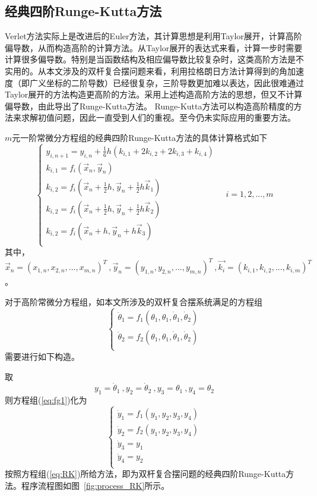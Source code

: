 \documentclass[a4paper,12pt,titlepage]{article}
\begin{document}
\subsection{经典四阶Runge-Kutta方法}
Verlet方法实际上是改进后的Euler方法，其计算思想是利用Taylor展开，计算高阶偏导数，从而构造高阶的计算方法。从Taylor展开的表达式来看，计算一步时需要计算很多偏导数。特别是当函数结构及相应偏导数比较复杂时，这类高阶方法是不实用的。从本文涉及的双杆复合摆问题来看，利用拉格朗日方法计算得到的角加速度（即广义坐标的二阶导数）已经很复杂，三阶导数更加难以表达，因此很难通过Taylor展开的方法构造更高阶的方法。采用上述构造高阶方法的思想，但又不计算偏导数，由此导出了Runge-Kutta方法。
Runge-Kutta方法可以构造高阶精度的方法来求解初值问题，因此一直受到人们的重视。至今仍未实际应用的重要方法。

$m$元一阶常微分方程组的经典四阶Runge-Kutta方法的具体计算格式如下
\begin{equation}
\label{eq:RK}
	\begin{cases}
		y_{i,n+1}=y_{i,n}+\frac{1}{6}h(k_{i,1}+2k_{i,2}+2k_{i,3}+k_{i,4}) \\
		k_{i,1}=f_i(\vec{x}_n,\vec{y}_n)\\
		k_{i,2}=f_i(\vec{x}_n+\frac{1}{2}h,\vec{y}_n+\frac{1}{2}h\vec{k}_1)\\
		k_{i,2}=f_i(\vec{x}_n+\frac{1}{2}h,\vec{y}_n+\frac{1}{2}h\vec{k}_2)\\
		k_{i,2}=f_i(\vec{x}_n+h,\vec{y}_n+h\vec{k}_3)\\
	\end{cases}
	\quad i = 1,2,...,m
\end{equation}
其中，$\vec{x}_n=(x_{1,n},x_{2,n},...,x_{m,n})^T~,\vec{y}_n=(y_{1,n},y_{2,n},...,y_{m,n})^T~,\vec{k_i}=(k_{i,1},k_{i,2},...,k_{i,m})^T$。

对于高阶常微分方程组，如本文所涉及的双杆复合摆系统满足的方程组
\begin{equation}
\label{eq:fg1}
	\begin{cases}
		\ddot{\theta}_1=f_1(\theta_1,\theta_1,\dot{\theta}_1,\dot{\theta}_2)\\
		\ddot{\theta}_2=f_2(\theta_1,\theta_1,\dot{\theta}_1,\dot{\theta}_2)\\
	\end{cases}
\end{equation}
需要进行如下构造。

\noindent 取
\begin{equation}
	 	y_1=\dot{\theta}_1~,
	 	y_2=\dot{\theta}_2~,
	 	y_3=\theta_1~,
	 	y_4=\theta_2
\end{equation}
则方程组(\ref{eq:fg1})化为
\begin{equation}
	\begin{cases}
		\dot{y}_1=f_1(y_1,y_2,y_3,y_4)\\
		\dot{y}_2=f_2(y_1,y_2,y_3,y_4)\\
		\dot{y}_3=y_1\\
		\dot{y}_4=y_2\\
	\end{cases}
\end{equation}
按照方程组(\ref{eq:RK})所给方法，即为双杆复合摆问题的经典四阶Runge-Kutta方法。程序流程图如图~\ref{fig:process_RK}所示。
\end{document}
